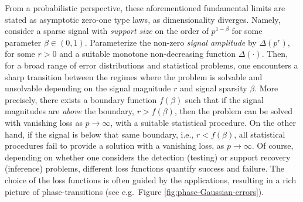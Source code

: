 From a probabilistic perspective, these aforementioned fundamental limits are stated as asymptotic zero-one type laws, as dimensionality diverges.  
Namely, consider a sparse signal with  {\em support size} on the order of $p^{1-\beta}$ for some parameter $\beta\in (0,1)$.  
Parameterize the non-zero {\em signal amplitude} by $\Delta(p^r)$, 
for some $r>0$ and a suitable monotone non-decreasing function $\Delta(\cdot)$.  Then, for a broad range of error distributions and
statistical problems, one encounters a sharp transition between the regimes where the problem is solvable and unsolvable depending on 
the signal magnitude $r$ and signal sparsity $\beta$.  More precisely, there exists a boundary function $f(\beta)$ such that if 
the signal magnitudes are {\em above} the boundary, $r> f(\beta)$, then the problem can be solved with vanishing loss as $p\to\infty$, with a suitable statistical procedure.  On the other hand, if the signal is below that same boundary, i.e., $r<f(\beta)$, all statistical procedures fail to  provide a solution with a vanishing loss, as $p\to\infty$. Of course, depending on whether one considers the  detection (testing) or 
support recovery (inference) problems, different loss functions quantify success and failure. The choice of the loss functions is often guided by the 
applications, resulting in a rich picture of phase-transitions (see e.g.\ Figure \ref{fig:phase-Gaussian-errors}).


